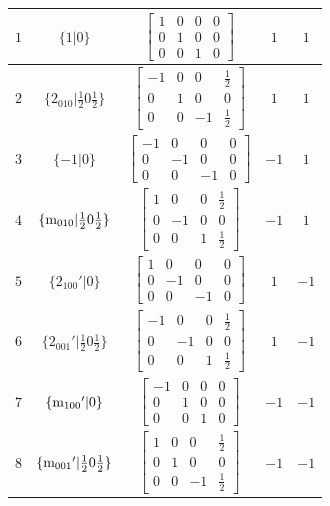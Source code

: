 \documentclass[fleqn,8pt]{jsarticle}
\begin{document}
\begin{longtable}{ccccc}
$ 1 $ & $ \{1|0\} $ & $ \begin{bmatrix} 1 & 0 & 0 & 0 \\ 0 & 1 & 0 & 0 \\ 0 & 0 & 1 & 0 \end{bmatrix} $ & $ 1 $ & $ 1 $ \\ \hline
$ 2 $ & $ \{2{}_{010}|\frac{1}{2} 0 \frac{1}{2}\} $ & $ \begin{bmatrix} -1 & 0 & 0 & \frac{1}{2} \\ 0 & 1 & 0 & 0 \\ 0 & 0 & -1 & \frac{1}{2} \end{bmatrix} $ & $ 1 $ & $ 1 $ \\ \hline
$ 3 $ & $ \{-1|0\} $ & $ \begin{bmatrix} -1 & 0 & 0 & 0 \\ 0 & -1 & 0 & 0 \\ 0 & 0 & -1 & 0 \end{bmatrix} $ & $ -1 $ & $ 1 $ \\ \hline
$ 4 $ & $ \{{\rm m}_{010}|\frac{1}{2} 0 \frac{1}{2}\} $ & $ \begin{bmatrix} 1 & 0 & 0 & \frac{1}{2} \\ 0 & -1 & 0 & 0 \\ 0 & 0 & 1 & \frac{1}{2} \end{bmatrix} $ & $ -1 $ & $ 1 $ \\ \hline
$ 5 $ & $ \{2{}_{100}{}'|0\} $ & $ \begin{bmatrix} 1 & 0 & 0 & 0 \\ 0 & -1 & 0 & 0 \\ 0 & 0 & -1 & 0 \end{bmatrix} $ & $ 1 $ & $ -1 $ \\ \hline
$ 6 $ & $ \{2{}_{001}{}'|\frac{1}{2} 0 \frac{1}{2}\} $ & $ \begin{bmatrix} -1 & 0 & 0 & \frac{1}{2} \\ 0 & -1 & 0 & 0 \\ 0 & 0 & 1 & \frac{1}{2} \end{bmatrix} $ & $ 1 $ & $ -1 $ \\ \hline
$ 7 $ & $ \{{\rm m}_{100}{}'|0\} $ & $ \begin{bmatrix} -1 & 0 & 0 & 0 \\ 0 & 1 & 0 & 0 \\ 0 & 0 & 1 & 0 \end{bmatrix} $ & $ -1 $ & $ -1 $ \\ \hline
$ 8 $ & $ \{{\rm m}_{001}{}'|\frac{1}{2} 0 \frac{1}{2}\} $ & $ \begin{bmatrix} 1 & 0 & 0 & \frac{1}{2} \\ 0 & 1 & 0 & 0 \\ 0 & 0 & -1 & \frac{1}{2} \end{bmatrix} $ & $ -1 $ & $ -1 $ \\
\end{longtable}
\end{document}
